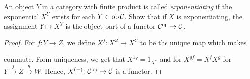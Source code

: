 \begin{exercise}{51}
    An object $Y$ in a category with finite product is called \textit{exponentiating} if the exponential $X^Y$ exists for each $Y\in\operatorname{ob}\mathcal{C}$.
    Show that if $X$ is exponentiating, the assignment $Y\mapsto X^Y$ is the object part of a functor $\mathcal{C}^{\text{op}}\to\mathcal{C}$.
\end{exercise}
\begin{solution}
    \begin{proof}
        For $f\colon Y\to Z$, we define $X^f\colon X^Z\to X^Y$ to be the unique map which makes
        \begin{center}
        \end{center}
        commute.
        From uniqueness, we get that $X^{1_Y}=1_{X^Y}$ and for $X^{gf}=X^fX^g$ for $Y\xrightarrow{f} Z\xrightarrow{g} W$.
        Hence, $X^{(-)}\colon\mathcal{C}^{\text{op}}\to\mathcal{C}$ is a functor.
    \end{proof}
\end{solution}

